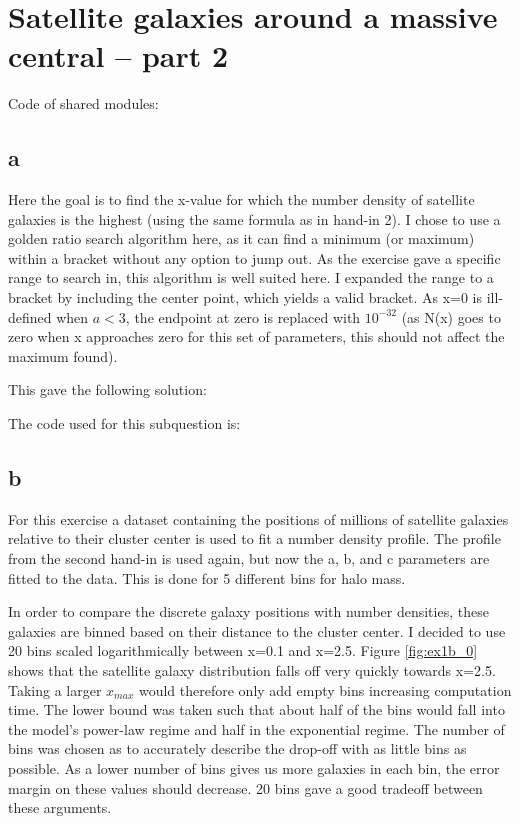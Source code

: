 \section{Satellite galaxies around a massive central – part 2}
Code of shared modules:


\newpage
\subsection*{a}
Here the goal is to find the x-value for which the number density of satellite galaxies is the highest (using the same formula as in hand-in 2).
I chose to use a golden ratio search algorithm here, as it can find a minimum (or maximum) within a bracket without any option to jump out.
As the exercise gave a specific range to search in, this algorithm is well suited here.
I expanded the range to a bracket by including the center point, which yields a valid bracket.
As x=0 is ill-defined when $a<3$, the endpoint at zero is replaced with $10^{-32}$ (as N(x) goes to zero when x approaches zero for this set of parameters, this should not affect the maximum found).

This gave the following solution:


The code used for this subquestion is:


\subsection*{b}
For this exercise a dataset containing the positions of millions of satellite galaxies relative to their cluster center is used to fit a number density profile.
The profile from the second hand-in is used again, but now the a, b, and c parameters are fitted to the data.
This is done for 5 different bins for halo mass.

In order to compare the discrete galaxy positions with number densities, these galaxies are binned based on their distance to the cluster center.
I decided to use 20 bins scaled logarithmically between x=0.1 and x=2.5. 
Figure \ref{fig:ex1b_0} shows that the satellite galaxy distribution falls off very quickly towards x=2.5. 
Taking a larger $x_{max}$ would therefore only add empty bins increasing computation time.
The lower bound was taken such that about half of the bins would fall into the model's power-law regime and half in the exponential regime.
The number of bins was chosen as to accurately describe the drop-off with as little bins as possible.
As a lower number of bins gives us more galaxies in each bin, the error margin on these values should decrease.
20 bins gave a good tradeoff between these arguments.

